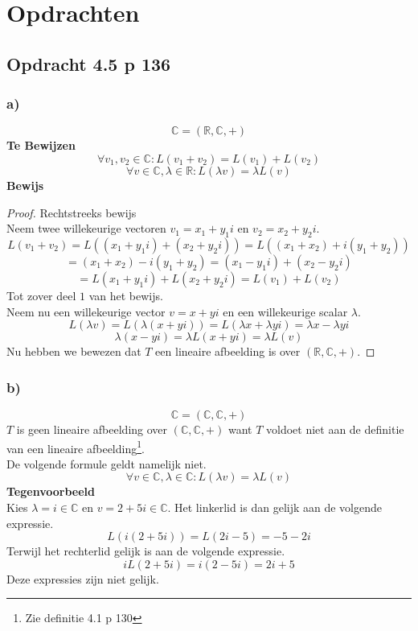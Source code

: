 \documentclass[lineaire_algebra_oplossingen.tex]{subfiles}
\begin{document}
\section{Opdrachten}

\subsection{Opdracht 4.5 p 136}
\label{4.5}
\subsubsection*{a)}
\[
\mathbb{C} = (\mathbb{R},\mathbb{C},+)
\]
\textbf{Te Bewijzen}\\
\[
\forall v_1,v_2 \in \mathbb{C}: L(v_1+v_2) = L(v_1)+L(v_2) 
\]
\[
\forall v\in \mathbb{C}, \lambda \in \mathbb{R}: L(\lambda v) = \lambda L(v)
\]
\textbf{Bewijs}\\
\begin{proof}
Rechtstreeks bewijs\\
Neem twee willekeurige vectoren $v_1 = x_1+y_1i$ en $v_2=x_2+y_2i$.
\[
L(v_1+v_2)=L( (x_1+y_1i) + (x_2+y_2i)) = L((x_1+x_2) + i(y_1+y_2))
\]
\[
= (x_1+x_2)-i(y_1+y_2) = (x_1-y_1i) + (x_2-y_2i)
\]
\[
= L(x_1+y_1i) + L(x_2+y_2i) = L(v_1)+L(v_2)
\]
Tot zover deel $1$ van het bewijs.\\
Neem nu een willekeurige vector $v=x+yi$ en een willekeurige scalar $\lambda$.
\[
L(\lambda v) = L(\lambda (x+yi)) = L(\lambda x + \lambda yi) = \lambda x - \lambda yi
\]
\[
\lambda (x-yi) = \lambda L(x+yi) = \lambda L(v)
\]
Nu hebben we bewezen dat $T$ een lineaire afbeelding is over $(\mathbb{R},\mathbb{C},+)$.
\end{proof}

\subsubsection*{b)}
\[
\mathbb{C} = (\mathbb{C},\mathbb{C},+)
\]
$T$ is geen lineaire afbeelding over $(\mathbb{C},\mathbb{C},+)$ want $T$ voldoet niet aan de definitie van een lineaire afbeelding\footnote{Zie definitie 4.1 p 130}. \\
De volgende formule geldt namelijk niet.
\[\forall v\in \mathbb{C}, \lambda \in \mathbb{C}: L(\lambda v) = \lambda L(v)\]
\textbf{Tegenvoorbeeld}\\
Kies $\lambda = i \in \mathbb{C}$ en $v = 2+5i\in \mathbb{C}$.
Het linkerlid is dan gelijk aan de volgende expressie.
\[
L(i(2+5i)) = L(2i-5) = -5 -2i
\]
Terwijl het rechterlid gelijk is aan de volgende expressie.
\[
iL(2+5i) = i(2-5i) = 2i+5
\]
Deze expressies zijn niet gelijk.
\end{document}
